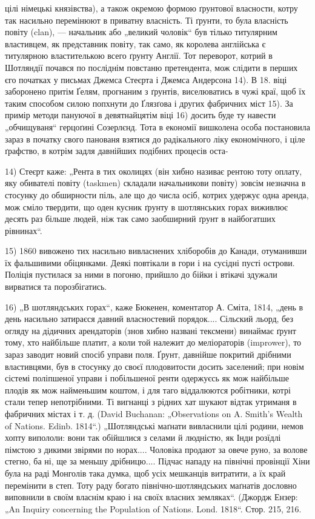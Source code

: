 цілі німецькі князівства), а також окремою формою ґрунтової власности, котру так насильно перемінюют в приватну власність. Ті ґрунти, то була власність повіту (clan), — начальник або „великий чоловік“ був тілько титулярним властивцем, як представник повіту, так само, як королева англійська є титулярною властителькою всего ґрунту Англії. Тот переворот, котрий в Шотляндії почався по посліднім повстаню претендента, мож слідити в перших єго початках у письмах Джемса Стеєрта і Джемса Андерсона 14). В 18. віці заборонено притім Ґелям, прогнаним з ґрунтів, виселюватись в чужі краї, щоб їх таким способом силою попхнути до Ґлязґова і других фабричних міст 15). За примір
методи пануючої в девятнайцятім віці 16) досить буде ту навести „обчищуваня“ герцоґині Созерлєнд. Тота в економії вишколена особа постановила зараз в початку свого панованя взятися до радікального ліку економічного, і ціле ґрафство, в котрім задля давнійших подібних процесів оста-

14) Стеєрт каже: „Рента в тих околицях (він хибно називає рентою тоту оплату, яку обивателі повіту (taskmen) складали начальникови повіту) зовсім незначна в стосунку до обширности піль, але що до числа осіб, котрих удержує одна аренда, мож сміло твердити, що оден кусник ґрунту в шотлянських горах виживлює десять раз більше людей, ніж так само заобширний ґрунт в найбогатших рівнинах“.

15) 1860 вивожено тих насильно вивласнених хліборобів до Канади, отуманивши їх фальшивими обіцянками. Деякі повтікали в гори і на сусідні пусті острови. Поліція пустилася за ними в погоню, прийшло до бійки і втікачі здужали вирватися та порозбігатись.

16) „В шотляндських горах“, каже Бюкенен, коментатор А. Сміта, 1814, „день в день насильно затираєся давний власностевий порядок.... Сільский льорд, без огляду на дідичних арендаторів (знов хибно названі тексмени) винаймає ґрунт тому, хто найбільше платит, а коли той належит до меліораторів (imprower), то зараз заводит новий спосіб управи поля. Ґрунт, давнійше покритий дрібними властивцями, був в стосунку до своєї плодовитости досить заселений; при новім сістемі поліпшеної
управи і побільшеної ренти одержуєсь як мож найбільше плодів як мож найменьшим коштом, і для таго віддалюются робітники, котрі стали тепер непотрібними. Ті вигнанці з рідних хат шукают відтак утриманя в фабричних містах і т. д. (David Buchanan: „Observations on A. Smith’s Wealth of Nations. Edinb. 1814“.) „Шотляндські маґнати вивласнили цілі родини, немов хопту випололи: вони так обійшлися з селами й людністю, як Інди розїдлі пімстою з дикими звірями по норах.... Чоловіка продают
за овече руно, за волове стегно, ба ні, ще за меньшу дрібницю.... Підчас нападу на північні провінції Хіни була на раді Монголів така думка, щоб усіх мешканців витратити, а їх край перемінити в степ. Тоту раду богато північно-шотляндських маґнатів дословно виповнили в своїм власнім краю і на своїх власних земляках“. (Джордж Ензер: „An Inquiry concerning the Population of Nations. Lond. 1818“. Стор. 215, 216.
